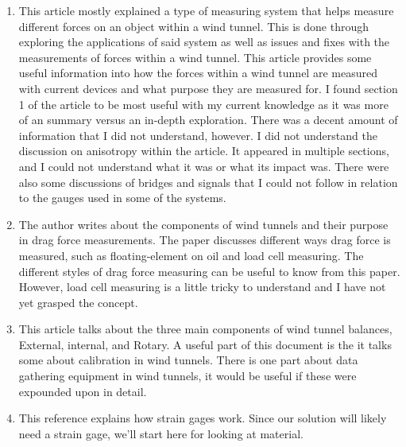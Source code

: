 \documentclass[12pt,letterpaper]{article}
\begin{document}
\begin{enumerate}
	\item \cite{Portman2009} This article mostly explained a type of measuring system that helps measure different forces on an object within a wind tunnel. This is done through exploring the applications of said system as well as issues and fixes with the measurements of forces within a wind tunnel. This article provides some useful information into how the forces within a wind tunnel are measured with current devices and what purpose they are measured for. I found section 1 of the article to be most useful with my current knowledge as it was more of an summary versus an in-depth exploration. There was a decent amount of information that I did not understand, however. I did not understand the discussion on anisotropy within the article. It appeared in multiple sections, and I could not understand what it was or what its impact was. There were also some discussions of bridges and signals that I could not follow in relation to the gauges used in some of the systems.
	
	\item \cite{Nan2013} The author writes about the components of wind tunnels and their purpose in drag force measurements. The paper discusses different ways drag force is measured, such as floating-element on oil and load cell measuring. The different styles of drag force measuring can be useful to know from this paper. However, load cell measuring is a little tricky to understand and I have not yet grasped the concept. 
	
	\item \cite{Gonzalez} This article talks about the three main components of wind tunnel balances, External, internal, and Rotary. A useful part of this document is the it talks some about calibration in wind tunnels. There is one part about data gathering equipment in wind tunnels, it would be useful if these were expounded upon in detail.  
	
	\item \cite{Wilson-strain-gage} This reference explains how strain gages work. Since our solution will likely need a strain gage, we'll start here for looking at material.


\end{enumerate}
\end{document}
